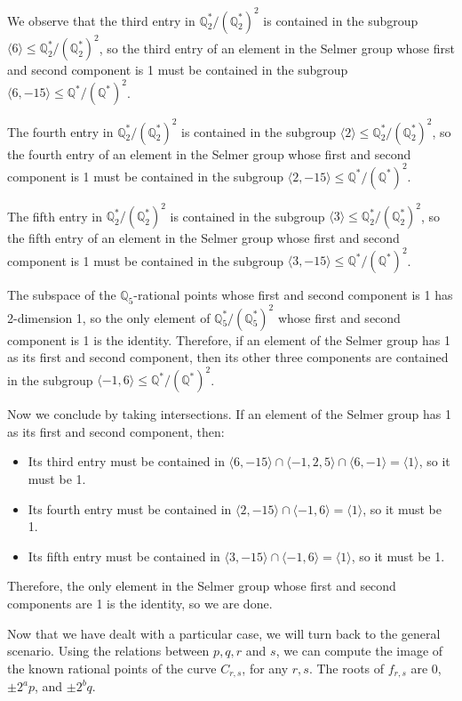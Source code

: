 \documentclass[a4paper, 12pt]{amsart}
\theoremstyle{definition}
\theoremstyle{plain}
\theoremstyle{plain}
\theoremstyle{plain}
\theoremstyle{plain}
\theoremstyle{remark}
\theoremstyle{remark}
\theoremstyle{plain}
\newcommand{\Q}{\mathbb{Q}}
\begin{document}
We observe that the third entry in $\Q_2^*/(\Q_2^*)^2$ is contained in the subgroup $\langle 6\rangle\le\Q_2^*/(\Q_2^*)^2$, so the third entry of an element in the Selmer group whose first and second component is 1 must be contained in the subgroup $\langle 6,-15\rangle\le \Q^*/(\Q^*)^2$.

The fourth entry in $\Q_2^*/(\Q_2^*)^2$ is contained in the subgroup $\langle 2\rangle\le\Q_2^*/(\Q_2^*)^2$, so the fourth entry of an element in the Selmer group whose first and second component is 1 must be contained in the subgroup $\langle 2,-15\rangle\le \Q^*/(\Q^*)^2$.

The fifth entry in $\Q_2^*/(\Q_2^*)^2$ is contained in the subgroup $\langle 3\rangle\le\Q_2^*/(\Q_2^*)^2$, so the fifth entry of an element in the Selmer group whose first and second component is 1 must be contained in the subgroup $\langle 3,-15\rangle\le \Q^*/(\Q^*)^2$.

The subspace of the $\Q_5$-rational points whose first and second component is 1 has 2-dimension 1, so the only element of $\Q_5^*/(\Q_5^*)^2$ whose first and second component is 1 is the identity. Therefore, if an element of the Selmer group has 1 as its first and second component, then its other three components are contained in the subgroup $\langle -1,6\rangle\le \Q^*/(\Q^*)^2$.

Now we conclude by taking intersections. If an element of the Selmer group has 1 as its first and second component, then:
\begin{itemize}
	\item Its third entry must be contained in $\langle 6,-15\rangle\cap\langle -1,2,5\rangle\cap\langle 6,-1\rangle=\langle 1\rangle$, so it must be 1.
	\item Its fourth entry must be contained in $\langle 2,-15\rangle\cap \langle -1,6\rangle= \langle1\rangle$, so it must be 1.
	\item Its fifth entry must be contained in $\langle 3,-15\rangle\cap \langle -1,6\rangle= \langle1\rangle$, so it must be 1.
\end{itemize}

Therefore, the only element in the Selmer group whose first and second components are 1 is the identity, so we are done.

Now that we have dealt with a particular case, we will turn back to the general scenario. Using the relations between $p,q,r$ and $s$, we can compute the image of the known rational points of the curve $C_{r,s}$, for any $r,s$. The roots of $f_{r,s}$ are $0$, $\pm 2^ap$, and $\pm 2^bq$.
\end{document}
